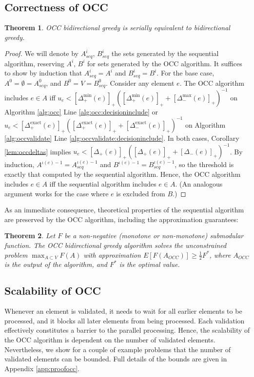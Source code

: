 \documentclass{article} %
\newtheorem{thm}{Theorem}[section]
\begin{document}
\subsection{Correctness of OCC}
\begin{thm} OCC bidirectional greedy is serially equivalent to bidirectional greedy.
\end{thm}
\begin{proof}
We will denote by $A_{seq}^i$, $B_{seq}^i$ the sets generated by the sequential algorithm, reserving $A^i$, $B^i$ for sets generated by the OCC algorithm.
It suffices to show by induction that $A_{seq}^i = A^i$ and $B_{seq}^i = B^i$.
For the base case, $A^0 = \emptyset = A_{seq}^0$, and $B^0 = V = B_{seq}^0$.
Consider any element $e$.
The OCC algorithm includes $e \in A$ iff $u_e < [\Delta_+^{\min}(e)]_+ ([\Delta_+^{\min}(e)]_+ + [\Delta_-^{\max}(e)]_+)^{-1}$ on Algorithm \ref{alg:occ} Line \ref{alg:occ:decisioninclude} or $u_e < [\Delta_+^{\text{exact}}(e)]_+ ([\Delta_+^{\text{exact}}(e)]_+ + [\Delta_-^{\text{exact}}(e)]_+)^{-1}$ on Algorithm \ref{alg:occvalidate} Line \ref{alg:occvalidate:decisioninclude}.
In both cases, Corollary \ref{lem:occdeltas} implies $u_e < [\Delta_+(e)]_+ ([\Delta_+(e)]_+ + [\Delta_-(e)]_+)^{-1}$.
By induction, $A^{\iota(e)-1} = A_{seq}^{\iota(e)-1}$ and $B^{\iota(e)-1} = B_{seq}^{\iota(e)-1}$, so the threshold is exactly that computed by the sequential algorithm.
Hence, the OCC algorithm includes $e \in A$ iff the sequential algorithm includes $e \in A$.
(An analogous argument works for the case where $e$ is excluded from $B$.)

\end{proof}

As an immediate consequence, theoretical properties of the sequential algorithm are preserved by the OCC algorithm, including the approximation guarantees:

\begin{thm} Let $F$ be a non-negative (monotone or non-monotone) submodular function.
The OCC bidirectional greedy algorithm solves the unconstrained problem $\max_{A\subset V} F(A)$ with approximation
$E[F(A_{OCC})] \geq \frac{1}{2}F^*$,
where $A_{OCC}$ is the output of the algorithm, and $F^*$ is the optimal value.
\end{thm}




\subsection{Scalability of OCC}
Whenever an element is validated, it needs to wait for all earlier elements to be processed, and it blocks all later elements from being processed.
Each validation effectively constitutes a barrier to the parallel processing.
Hence, the scalability of the OCC algorithm is dependent on the number of validated elements.
Nevertheless, we show for a couple of example problems that the number of validated elements can be bounded.
Full details of the bounds are given in Appendix \ref{app:proofocc}.
\end{document}
